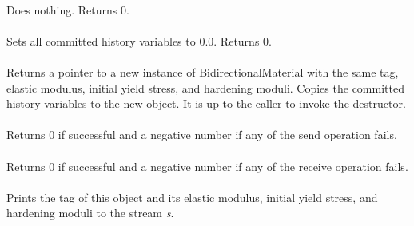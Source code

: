  \\
Does nothing. Returns 0. \\

 \\
Sets all committed history variables to $0.0$. Returns 0. \\

 \\
Returns a pointer to a new instance of BidirectionalMaterial with the 
same tag, elastic modulus, initial yield stress, and 
hardening moduli. Copies the committed history variables to the 
new object. It is up to the caller to invoke the destructor. \\

\\
Returns 0 if successful and a negative number if any of the 
send operation fails. \\

\\
Returns 0 if successful and a negative number if any of the 
receive operation fails. \\

 \\
Prints the tag of this object and its elastic modulus, initial yield
stress, and hardening moduli to the stream {\em s}.

